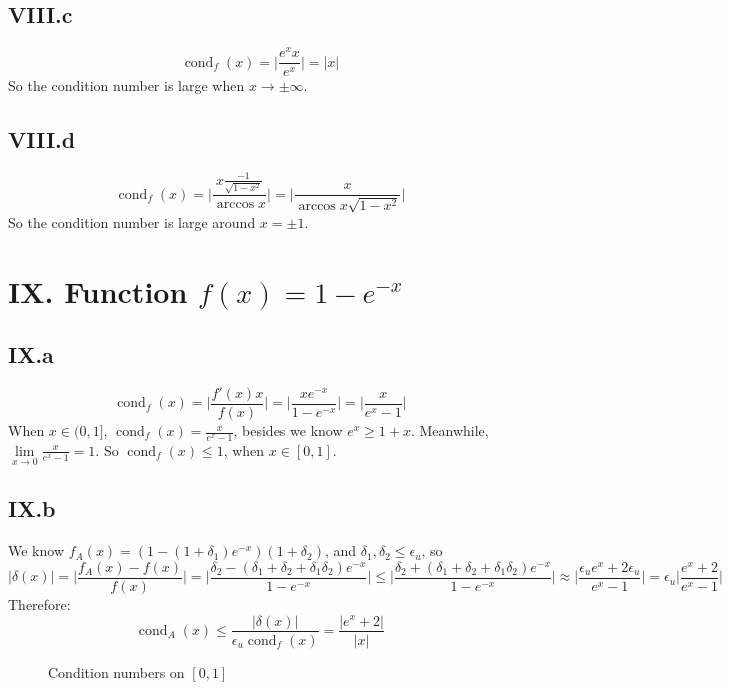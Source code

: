 \documentclass[a4paper]{article}
\begin{document}
\subsection*{VIII.c}
\[
\operatorname{cond}_{f}(x) = \bigg|\frac{e^xx}{e^x}\bigg|
= |x|
\]
So the condition number is large when $x \rightarrow \pm \infty$.

\subsection*{VIII.d}
\[
\operatorname{cond}_{f}(x) = \bigg|\frac{x\frac{-1}{\sqrt{1-x^2}}}{\arccos x}\bigg|
= \bigg|\frac{x}{\arccos x \sqrt{1-x^2}}\bigg|
\]
So the condition number is large around $x = \pm 1$.

\section*{IX. Function $f(x) = 1-e^{-x}$}
\subsection*{IX.a}
\[
\operatorname{cond}_{f}(x) = \bigg|\frac{f'(x)x}{f(x)}\bigg| = \bigg|\frac{xe^{-x}}{1-e^{-x}}\bigg| = 
\bigg|\frac{x}{e^x-1}\bigg|
\]
When $x\in(0,1]$, $\operatorname{cond}_{f}(x) = \frac{x}{e^x-1}$, besides we know $e^x \geqslant 1 + x$. Meanwhile,
$\lim\limits_{{x \rightarrow 0}} \frac{x}{e^x-1} = 1$.
So $\operatorname{cond}_{f}(x) \leqslant 1$, when $x\in [0,1]$.

\subsection*{IX.b}

We know $f_A(x) = (1 - (1+\delta_1)e^{-x})(1+\delta_2)$, and $\delta_1,\delta_2
\leqslant \epsilon_u$, so
\[
|\delta(x)| = \bigg|\frac{f_A(x) - f(x)}{f(x)}\bigg| = 
\bigg|\frac{\delta_2 - (\delta_1+\delta_2+\delta_1\delta_2)e^{-x}}{1-e^{-x}}\bigg|
\leqslant \bigg|\frac{\delta_2 + (\delta_1+\delta_2+\delta_1\delta_2)e^{-x}}{1-e^{-x}}\bigg|
\approx \bigg|\frac{\epsilon_u e^x + 2\epsilon_u}{e^x - 1}\bigg|
 = \epsilon_u\bigg|\frac{ e^x + 2}{e^x - 1}\bigg|
\]
Therefore:
\[
\operatorname{cond}_{A}(x) \leqslant \frac{|\delta(x)|}{\epsilon_u \operatorname{cond}_f(x)}
= \frac{|e^x+2|}{|x|}
\]
\begin{figure}[h]
  \centering
  \caption{Condition numbers on $[0,1]$}
\end{figure}
\end{document}
